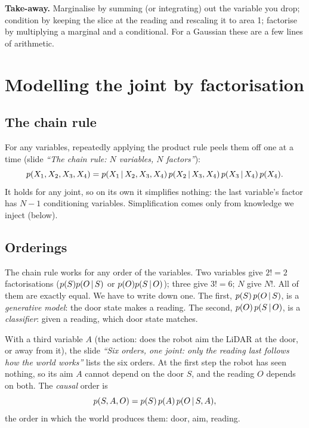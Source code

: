 \documentclass[11pt]{article}
\newcommand{\slide}[1]{\textit{``#1''}}
\begin{document}
\begin{keyidea}
\textbf{Take-away.} Marginalise by summing (or integrating) out the variable you drop; condition by keeping the slice at the reading and rescaling it to area 1; factorise by multiplying a marginal and a conditional. For a Gaussian these are a few lines of arithmetic.
\end{keyidea}

\section{Modelling the joint by factorisation}

\subsection*{The chain rule}
For any variables, repeatedly applying the product rule peels them off one at a time (slide \slide{The chain rule: $N$ variables, $N$ factors}):
\[
p(X_1,X_2,X_3,X_4)=p(X_1\,|\, X_2,X_3,X_4)\,p(X_2\,|\, X_3,X_4)\,p(X_3\,|\, X_4)\,p(X_4).
\]
It holds for any joint, so on its own it simplifies nothing: the last variable's factor has $N-1$ conditioning variables. Simplification comes only from knowledge we inject (below).

\subsection*{Orderings}
The chain rule works for any order of the variables. Two variables give $2!=2$ factorisations ($p(S)p(O\,|\, S)$ or $p(O)p(S\,|\, O)$); three give $3!=6$; $N$ give $N!$. All of them are exactly equal. We have to write down one.
The first, $p(S)\,p(O\,|\, S)$, is a \emph{generative model}: the door state makes a reading. The second, $p(O)\,p(S\,|\, O)$, is a \emph{classifier}: given a reading, which door state matches.

With a third variable $A$ (the action: does the robot aim the LiDAR at the door, or away from it), the slide \slide{Six orders, one joint: only the reading last follows how the world works} lists the six orders. 
At the first step the robot has seen nothing, so its aim $A$ cannot depend on the door $S$, and the reading $O$ depends on both. The \emph{causal} order is
\[
p(S,A,O)=p(S)\,p(A)\,p(O\,|\, S,A),
\]
the order in which the world produces them: door, aim, reading.
\end{document}
